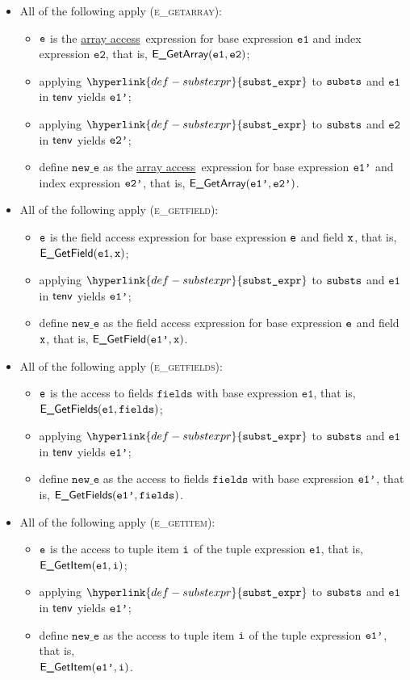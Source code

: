 \documentclass{book}
\newcommand\substexpr[0]{\hyperlink{def-substexpr}{\texttt{subst\_expr}}}
\newcommand\arrayaccess[0]{\hyperlink{def-arrayaccess}{array access}}
\newcommand\veone[0]{\texttt{e1}}
\newcommand\vetwo[0]{\texttt{e2}}
\newcommand\fields[0]{\texttt{fields}}
\newcommand\newe[0]{\texttt{new\_e}}
\begin{document}
\begin{itemize}
  \item All of the following apply (\textsc{e\_getarray}):
  \begin{itemize}
    \item $\texttt{e}$ is the \arrayaccess\ expression for base expression $\veone$ and index expression $\vetwo$,
          that is, $\EGetArray(\veone, \vetwo)$;
    \item applying $\substexpr$ to $\texttt{substs}$ and $\veone$ in $\textsf{tenv}$ yields $\texttt{e1'}$;
    \item applying $\substexpr$ to $\texttt{substs}$ and $\vetwo$ in $\textsf{tenv}$ yields $\texttt{e2'}$;
    \item define $\newe$ as the \arrayaccess\ expression for base expression $\texttt{e1'}$ and index expression $\texttt{e2'}$,
    that is, $\textsf{E\_GetArray}(\texttt{e1'}, \texttt{e2'})$.
  \end{itemize}

  \item All of the following apply (\textsc{e\_getfield}):
  \begin{itemize}
    \item $\texttt{e}$ is the field access expression for base expression $\texttt{e}$ and field $\texttt{x}$,
          that is, $\EGetField(\veone, \vx)$;
    \item applying $\substexpr$ to $\texttt{substs}$ and $\veone$ in $\textsf{tenv}$ yields $\texttt{e1'}$;
    \item define $\newe$ as the field access expression for base expression $\texttt{e}$ and field $\texttt{x}$,
          that is, $\textsf{E\_GetField}(\texttt{e1'}, \texttt{x})$.
  \end{itemize}

  \item All of the following apply (\textsc{e\_getfields}):
  \begin{itemize}
    \item $\texttt{e}$ is the access to fields $\fields$ with base expression $\veone$, that is, \\
          $\EGetFields(\veone, \fields)$;
    \item applying $\substexpr$ to $\texttt{substs}$ and $\veone$ in $\textsf{tenv}$ yields $\texttt{e1'}$;
    \item define $\newe$ as the access to fields $\fields$ with base expression $\texttt{e1'}$, that is, $\EGetFields(\veonep, \fields)$.
  \end{itemize}

  \item All of the following apply (\textsc{e\_getitem}):
  \begin{itemize}
    \item $\texttt{e}$ is the access to tuple item $\texttt{i}$ of the tuple expression $\veone$, that is, \\
          $\EGetItem(\veone, \vi)$;
    \item applying $\substexpr$ to $\texttt{substs}$ and $\veone$ in $\textsf{tenv}$ yields $\texttt{e1'}$;
    \item define $\newe$ as the access to tuple item $\texttt{i}$ of the tuple expression $\texttt{e1'}$, that is, \\
          $\textsf{E\_GetItem}(\texttt{e1'}, \texttt{i})$.
  \end{itemize}


\end{itemize}
\end{document}
